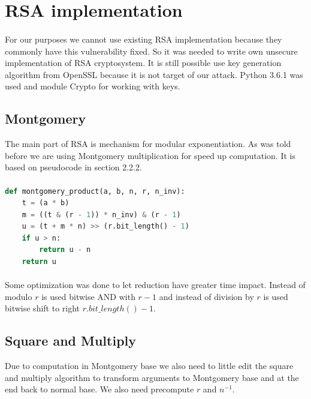 \documentclass[thesis=B,english]{FITthesis}[2012/10/20]
\begin{document}
\section{RSA implementation}

\paragraph*{}{
For our purposes we cannot use existing RSA implementation because they commonly have this vulnerability fixed. So it was needed to write own unsecure implementation of RSA cryptosystem.
It is still possible use key generation algorithm from OpenSSL because it is not target of our attack. Python 3.6.1 was used and module Crypto for working with keys.
}
\subsection{Montgomery}{
The main part of RSA is mechanism for modular exponentiation. As was told before we are using Montgomery multiplication for speed up computation. It is based on pseudocode in section 2.2.2.
}
\paragraph*{}
\begin{lstlisting}[language=Python]
def montgomery_product(a, b, n, r, n_inv):
    t = (a * b)
    m = ((t & (r - 1)) * n_inv) & (r - 1)
    u = (t + m * n) >> (r.bit_length() - 1)
    if u > n:
        return u - n
    return u
\end{lstlisting}

\paragraph*{}{
Some optimization was done to let reduction have greater time impact. Instead of modulo \(r\) is used bitwise AND with \(r-1\) and instead of division by \(r\) is used bitwise
shift to right \(r.bit\_length() - 1\).
}

\subsection{Square and Multiply}{
Due to computation in Montgomery base we also need to little edit the square and multiply algorithm to transform arguments to Montgomery base and at the end back to normal base.
We also need precompute \(r\) and \(n^{-1}\).
}
\end{document}
